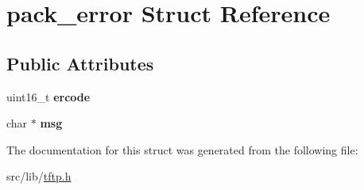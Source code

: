 \hypertarget{structpack__error}{}\section{pack\+\_\+error Struct Reference}
\label{structpack__error}
\subsection*{Public Attributes}
\begin{DoxyCompactItemize}
\item 
uint16\+\_\+t {\bfseries ercode}\hypertarget{structpack__error_a2277d88f47761ca35420f75ec268414e}{}\label{structpack__error_a2277d88f47761ca35420f75ec268414e}

\item 
char $\ast$ {\bfseries msg}\hypertarget{structpack__error_a9922c5ce6ba29d4df94bab403e8b226b}{}\label{structpack__error_a9922c5ce6ba29d4df94bab403e8b226b}

\end{DoxyCompactItemize}


The documentation for this struct was generated from the following file\+:\begin{DoxyCompactItemize}
\item 
src/lib/\hyperlink{tftp_8h}{tftp.\+h}\end{DoxyCompactItemize}
